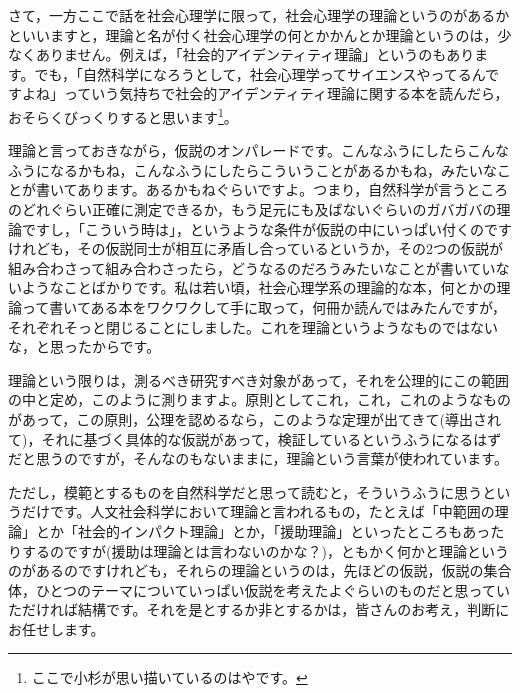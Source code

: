 \documentclass{ltjsbook}
\begin{document}
さて，一方ここで話を社会心理学に限って，社会心理学の理論というのがあるかといいますと，理論と名が付く社会心理学の何とかかんとか理論というのは，少なくありません。例えば，「社会的アイデンティティ理論」というのもあります。でも，「自然科学になろうとして，社会心理学ってサイエンスやってるんですよね」っていう気持ちで社会的アイデンティティ理論に関する本を読んだら，おそらくびっくりすると思います\footnote{ここで小杉が思い描いているのは\textcite{Turner1987}や\textcite{MAHogg1988}です。}。

理論と言っておきながら，仮説のオンパレードです。こんなふうにしたらこんなふうになるかもね，こんなふうにしたらこういうことがあるかもね，みたいなことが書いてあります。あるかもねぐらいですよ。つまり，自然科学が言うところのどれぐらい正確に測定できるか，もう足元にも及ばないぐらいのガバガバの理論ですし，「こういう時は」，というような条件が仮説の中にいっぱい付くのですけれども，その仮説同士が相互に矛盾し合っているというか，その2つの仮説が組み合わさって組み合わさったら，どうなるのだろうみたいなことが書いていないようなことばかりです。私は若い頃，社会心理学系の理論的な本，何とかの理論って書いてある本をワクワクして手に取って，何冊か読んではみたんですが，それぞれそっと閉じることにしました。これを理論というようなものではないな，と思ったからです。

理論という限りは，測るべき研究すべき対象があって，それを公理的にこの範囲の中と定め，このように測りますよ。原則としてこれ，これ，これのようなものがあって，この原則，公理を認めるなら，このような定理が出てきて(導出されて)，それに基づく具体的な仮説があって，検証しているというふうになるはずだと思うのですが，そんなのもないままに，理論という言葉が使われています。

ただし，模範とするものを自然科学だと思って読むと，そういうふうに思うというだけです。人文社会科学において理論と言われるもの，たとえば「中範囲の理論」とか「社会的インパクト理論」とか，「援助理論」といったところもあったりするのですが(援助は理論とは言わないのかな？)，ともかく何かと理論というのがあるのですけれども，それらの理論というのは，先ほどの仮説，仮説の集合体，ひとつのテーマについていっぱい仮説を考えたよぐらいのものだと思っていただければ結構です。それを是とするか非とするかは，皆さんのお考え，判断にお任せします。
\end{document}
